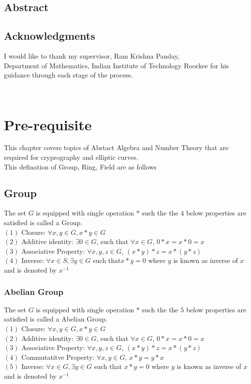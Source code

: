 \documentclass[12pt,a4paper]{report}
\begin{document}
	\cleardoublepage	




	\section*{Abstract}
	\cleardoublepage
	\section*{Acknowledgments}
	I would like to thank my supervisor, Ram Krishna Panday,\\Department
of Mathematics, Indian Institute of Technology Roorkee for his guidance through each stage of the process. 
	\cleardoublepage	
	
	
	\tableofcontents
	\thispagestyle{empty}
	\cleardoublepage	
	\
	\setcounter{page}{1}
	
	\chapter{Pre-requisite}
	This chapter covers topics of Abstact Algebra and Number Theory that are required for cryprography and elliptic curves.\\
	 This defination of Group, Ring, Field are as follows
	\section{Group}
	The set  $G$ is equipped with  single operation $*$ such the the $4$ below properties are satisfied is called a Group.\\
	$(1)$ Closure: $\forall x,y \in G, x*y \in G$ \\
	$(2)$ Additive identity: $\exists 0 \in G$, such that $ \forall x \in G$, $ 0*x=x*0=x$\\
	$(3)$ Associative Property: $ \forall x,y,z \in G$, $(x*y)*z=x*(y*z)$ \\
	$(4)$ Inverse: $ \forall x \in S, \exists y \in G$ such that$x*y=0$ where $y$ is known as inverse of $x$ and is denoted by $x^{-1}$
	\subsection{Abelian Group}
	The set $G$ is equipped with  single operation $*$ such the the $5$ below properties are satisfied is called a Abelian Group.\\
	$(1)$ Closure: $\forall x,y \in G, x*y \in G$ \\
	$(2)$ Additive identity: $\exists 0 \in G$, such that $ \forall x \in G$, $ 0*x=x*0=x$\\
	$(3)$ Associative Property: $ \forall x,y,z \in G$, $(x*y)*z=x*(y*z)$ \\
	$(4)$ Commutatitve Property: $ \forall x,y \in G$, $x*y=y*x$ \\
	$(5)$ Inverse: $ \forall x \in G, \exists y \in G$ such that $x*y=0$ where $y$ is known as inverse of $x$ and is denoted by $x^{-1}$	
	
\end{document}
